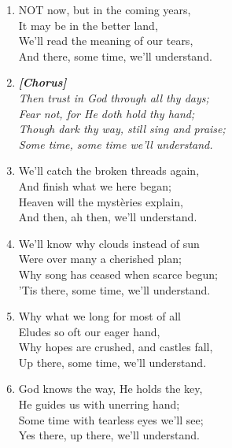 \documentclass[11pt,a4paper]{article}
\begin{document}
\begin{enumerate}
    \item NOT now, but in the coming years, \\
        It may be in the better land, \\
        We'll read the meaning of our tears, \\
        And there, some time, we'll understand.

    \item[] \vspace{0.4em}
    \textbf{\textit{[Chorus]}} \\
    \textit{Then trust in God through all thy days;} \\
    \textit{Fear not, for He doth hold thy hand;} \\
    \textit{Though dark thy way, still sing and praise;} \\
    \textit{Some time, some time we'll understand.}
    \vspace{0.4em}

    \item We'll catch the broken threads again, \\
        And finish what we here began; \\
        Heaven will the myst\`eries explain, \\
        And then, ah then, we'll understand.

    \item We'll know why clouds instead of sun \\
        Were over many a cherished plan; \\
        Why song has ceased when scarce begun; \\
        'Tis there, some time, we'll understand.

    \item Why what we long for most of all \\
        Eludes so oft our eager hand, \\
        Why hopes are crushed, and castles fall, \\
        Up there, some time, we'll understand.

    \item God knows the way, He holds the key, \\
        He guides us with unerring hand; \\
        Some time with tearless eyes we'll see; \\
        Yes there, up there, we'll understand.

\end{enumerate}
\end{document}
